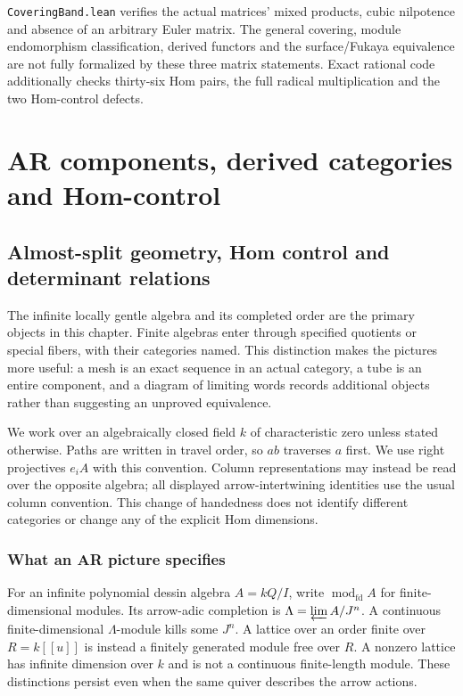 \documentclass[11pt,oneside,openany]{book}
\theoremstyle{definition}\newtheorem{definition}[theorem]{Definition}
\theoremstyle{remark}\newtheorem{remark}[theorem]{Remark}
\begin{document}
\texttt{CoveringBand.lean} verifies the actual matrices' mixed products,
cubic nilpotence and absence of an arbitrary Euler matrix. The general
covering, module endomorphism classification, derived functors and the
surface/Fukaya equivalence are not fully formalized by these three matrix
statements. Exact rational code additionally checks thirty-six Hom pairs,
the full radical multiplication and the two Hom-control defects.


\part{AR components, derived categories and Hom-control}
\chapter[AR geometry and determinant relations]{Almost-split geometry, Hom control and determinant relations}
\label{arb:chapter}

The infinite locally gentle algebra and its completed order are the primary
objects in this chapter. Finite algebras enter through specified quotients or
special fibers, with their categories named. This distinction makes the pictures
more useful: a mesh is an exact sequence in an actual category, a tube is an
entire component, and a diagram of limiting words records additional objects
rather than suggesting an unproved equivalence.

We work over an algebraically closed field $k$ of characteristic zero unless
stated otherwise. Paths are written in travel order, so $ab$ traverses $a$ first.
We use right projectives $e_iA$ with this convention. Column representations may
instead be read over the opposite algebra; all displayed arrow-intertwining
identities use the usual column convention. This change of handedness does not
identify different categories or change any of the explicit Hom dimensions.

\section{What an AR picture specifies}
For an infinite polynomial dessin algebra $A=kQ/I$, write
$\operatorname{mod}_{\mathrm{fd}}A$ for finite-dimensional modules. Its arrow-adic
completion is $\Lambda=\varprojlim A/J^n$. A continuous finite-dimensional
$\Lambda$-module kills some $J^n$. A lattice over an order finite over
$R=k[[u]]$ is instead a finitely generated module free over $R$. A nonzero
lattice has infinite dimension over $k$ and is not a continuous finite-length
module. These distinctions persist even when the same quiver describes the
arrow actions.
\end{document}
